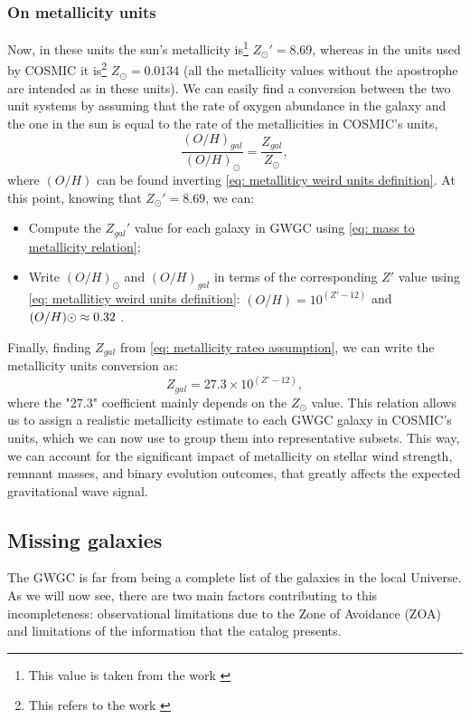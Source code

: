 \subsubsection{On metallicity units}\label{sec:on_metallicity_units} %
Now, in these units the sun's metallicity is\footnote{This value is taken from the work \cite{AllendePrieto}} $Z_\odot ' = 8.69$, whereas in the units used by COSMIC it is\footnote{This refers to the work \cite{Asplund}} $Z_\odot=0.0134$ (all the metallicity values without the apostrophe are intended as in these units).
We can easily find a conversion between the two unit systems by assuming that the rate of oxygen abundance in the galaxy and the one in the sun is equal to the rate of the metallicities in COSMIC's units,
\begin{equation}
    \frac{(O/H)_{gal}}{(O/H)_\odot}=\frac{Z_{gal}}{Z_\odot},
    \label{eq: metallicity rateo assumption}
\end{equation}
where $(O/H)$ can be found inverting \eqref{eq: metalliticy weird units definition}. 
At this point, knowing that $Z_\odot ' = 8.69$, we can:
\begin{itemize}
    \item Compute the $Z_{gal}'$ value for each galaxy in GWGC using \eqref{eq: mass to metallicity relation};
    \item Write $(O/H)_\odot$ and $(O/H)_{gal}$ in terms of the corresponding  $Z'$ value using \eqref{eq: metalliticy weird units definition}: $(O/H)=10^{(Z'-12)}$ and  $(O/H)\odot \approx 0.32\hspace{1mm}$. 
\end{itemize}
Finally, finding $Z_{gal}$ from \eqref{eq: metallicity rateo assumption}, we can write the metallicity units conversion as:
\begin{equation}
    Z_{gal}=27.3\times10^{(Z'-12)},
    \label{eq: Metallicity unit conversion}
\end{equation}
where the "$27.3$" coefficient mainly depends on the $Z_\odot$ value.
This relation allows us to assign a realistic metallicity estimate to each GWGC galaxy in COSMIC's units, which we can now use to group them into representative subsets. 
This way, we can account for the significant impact of metallicity on stellar wind strength, remnant masses, and binary evolution outcomes, that greatly affects the expected gravitational wave signal.


\subsection{Missing galaxies}
The GWGC is far from being a complete list of the galaxies in the local Universe.
As we will now see, there are two main factors contributing to this incompleteness: observational limitations due to the Zone of Avoidance (ZOA) and limitations of the information that the catalog presents.

